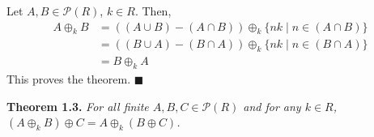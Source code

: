 \documentclass{article}
\begin{document}
Let $A, B \in \mathcal{P}(R)$, $k \in R$. Then,
\[\begin{split}
    A \oplus_k B
    &= ((A \cup B) - (A \cap B)) \oplus_k \{nk \mid n \in (A \cap B)\} \\
    &= ((B \cup A) - (B \cap A)) \oplus_k \{nk \mid n \in (B \cap A)\} \\
    &= B \oplus_k A
\end{split}\]
This proves the theorem. $\blacksquare$

\textbf{Theorem 1.3.} \textit{
    For all finite $A, B, C \in \mathcal{P}(R)$
    and for any $k \in R$,
    $(A \oplus_k B) \oplus C = A \oplus_k (B \oplus C)$.
}
\end{document}
